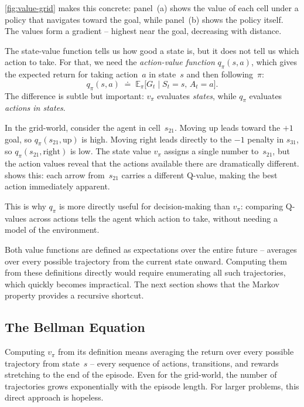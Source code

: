 \smallskip
\cref{fig:value-grid} makes this concrete: panel~(a) shows the
value of each cell under a policy that navigates toward the goal,
while panel~(b) shows the policy itself. The values form a
gradient -- highest near the goal, decreasing with distance.



\smallskip
The state-value function tells us how good a state is, but it
does not tell us which action to take. For that, we need the
\emph{action-value function} $q_\pi(s, a)$, which gives the
expected return for taking action~$a$ in state~$s$ and then
following~$\pi$:
%
\begin{equation}
\label{eq:q-pi}
q_\pi(s, a) \;\doteq\; \mathbb{E}_\pi\!\big[G_t \mid S_t = s,\, A_t = a\big].
\end{equation}
%
The difference is subtle but important: $v_\pi$ evaluates
\emph{states}, while $q_\pi$ evaluates \emph{actions in states}.

\smallskip
In the grid-world, consider the agent in cell~$s_{21}$.
Moving up leads toward the $+1$ goal, so
$q_\pi(s_{21}, \text{up})$ is high. Moving right leads directly
to the $-1$ penalty in $s_{31}$, so
$q_\pi(s_{21}, \text{right})$ is low. The state value $v_\pi$
assigns a single number to~$s_{21}$, but the action values reveal
that the actions available there are dramatically different.
 shows this: each arrow from~$s_{21}$ carries
a different Q-value, making the best action immediately apparent.



\smallskip
This is why $q_\pi$ is more directly useful for decision-making
than $v_\pi$: comparing Q-values across actions tells the agent
which action to take, without needing a model of the environment.

\smallskip
Both value functions are defined as expectations over the entire
future -- averages over every possible trajectory from the current
state onward. Computing them from these definitions directly would
require enumerating all such trajectories, which quickly becomes
impractical. The next section shows that the Markov property provides
a recursive shortcut.

\subsection{The Bellman Equation}
\label{subsec:bellman-equation}

Computing $v_\pi$ from its definition means averaging the return over
every possible trajectory from state~$s$ -- every sequence of
actions, transitions, and rewards stretching to the end of the
episode. Even for the grid-world, the number of trajectories grows
exponentially with the episode length. For larger problems, this
direct approach is hopeless.

